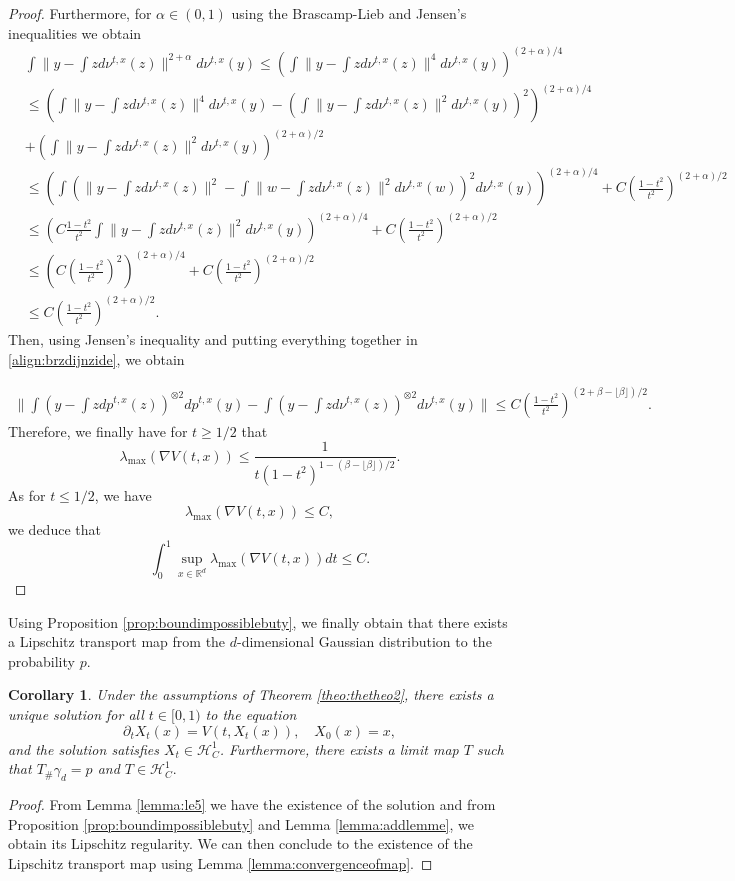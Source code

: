 \documentclass{article}
\newtheorem{corollary}{Corollary}
\begin{document}
\begin{proof}
Furthermore, for $\alpha \in (0,1)$ using the Brascamp-Lieb and Jensen's inequalities we obtain
\begin{align*}
    &\int \|y-\int z d\nu^{t,x}(z)\|^{2+\alpha} d\nu^{t,x}(y) \leq \left(\int \|y-\int z d\nu^{t,x}(z)\|^{4} d\nu^{t,x}(y)\right)^{(2+\alpha)/4}\\
   & \leq \left(\int \|y-\int z d\nu^{t,x}(z)\|^{4} d\nu^{t,x}(y)-\left(\int \|y-\int z d\nu^{t,x}(z)\|^{2} d\nu^{t,x}(y)\right)^{2}\right)^{(2+\alpha)/4}\\
   & +\left(\int \|y-\int z d\nu^{t,x}(z)\|^{2} d\nu^{t,x}(y)\right)^{(2+\alpha)/2}\\
   & \leq \left(\int \left(\|y-\int z d\nu^{t,x}(z)\|^{2} -\int \|w-\int z d\nu^{t,x}(z)\|^{2} d\nu^{t,x}(w)\right)^2d\nu^{t,x}(y)\right)^{(2+\alpha)/4}+C\left(\frac{1-t^2}{t^2}\right)^{(2+\alpha)/2}\\
   & \leq \left(C\frac{1-t^2}{t^2} \int \|y-\int z d\nu^{t,x}(z)\|^{2}d\nu^{t,x}(y)\right)^{(2+\alpha)/4}+C\left(\frac{1-t^2}{t^2}\right)^{(2+\alpha)/2}
   \\
   & \leq \left(C\left(\frac{1-t^2}{t^2}\right)^2\right)^{(2+\alpha)/4}+C\left(\frac{1-t^2}{t^2}\right)^{(2+\alpha)/2}\\
   & \leq C\left(\frac{1-t^2}{t^2}\right)^{(2+\alpha)/2}.
\end{align*}
Then, using Jensen's inequality and putting everything together in \eqref{align:brzdijnzide}, we obtain

\begin{align*}
    \|\int \left(y-\int zdp^{t,x}(z)\right)^{\otimes 2}dp^{t,x}(y)-\int\left(y-\int zd\nu^{t,x}(z)\right)^{\otimes 2}d\nu^{t,x}(y)\|\leq C\left(\frac{1-t^2}{t^2}\right)^{(2+\beta-\lfloor \beta\rfloor)/2}.
\end{align*}
Therefore, we finally have for $t\geq 1/2$ that
$$\lambda_{\max}(\nabla V(t,x))\leq \frac{1}{t(1-t^2)^{1-(\beta-\lfloor \beta\rfloor)/2}}.$$
As for $t\leq 1/2$, we have
$$\lambda_{\max}(\nabla V(t,x))\leq C,$$
we deduce that 
$$\int_0^1 \sup_{x\in \mathbb{R}^d}\lambda_{\max}(\nabla V(t,x))dt\leq C.$$
\end{proof}
Using Proposition \ref{prop:boundimpossiblebuty}, we finally obtain that there exists a Lipschitz transport map from the $d$-dimensional Gaussian distribution to the probability $p$.

\begin{corollary}\label{coro:onasue}
    Under the assumptions of Theorem \ref{theo:thetheo2}, there exists a unique solution for all $t\in [0,1)$ to the equation
    $$\partial_t X_t(x) =V(t,X_t(x)), \quad X_0(x)=x,$$
    and the solution satisfies $X_t\in \mathcal{H}^1_C$.
    Furthermore, there exists a limit map $T$ such that $T_{\#}\gamma_d=p$ and
    $T \in \mathcal{H}^1_C.$
\end{corollary}
\begin{proof}
    From Lemma \ref{lemma:le5} we have the existence of the solution and from  Proposition \ref{prop:boundimpossiblebuty} and Lemma \ref{lemma:addlemme}, we obtain its Lipschitz regularity. We can then conclude to the existence of the Lipschitz transport map using Lemma \ref{lemma:convergenceofmap}.
\end{proof}
\end{document}

